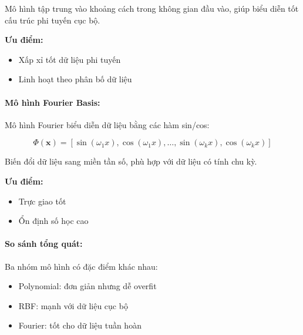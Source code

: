 Mô hình tập trung vào khoảng cách trong không gian đầu vào, giúp biểu diễn tốt cấu trúc phi tuyến cục bộ.

\textbf{Ưu điểm:}
\begin{itemize}
    \item Xấp xỉ tốt dữ liệu phi tuyến
    \item Linh hoạt theo phân bố dữ liệu
\end{itemize}

\paragraph{Mô hình Fourier Basis:}
Mô hình Fourier biểu diễn dữ liệu bằng các hàm sin/cos:

\begin{equation}
\Phi(\boldsymbol{x}) =
[\sin(\omega_1 x), \cos(\omega_1 x), \dots, \sin(\omega_k x), \cos(\omega_k x)]
\end{equation}

Biến đổi dữ liệu sang miền tần số, phù hợp với dữ liệu có tính chu kỳ.

\textbf{Ưu điểm:}
\begin{itemize}
    \item Trực giao tốt
    \item Ổn định số học cao
\end{itemize}

\paragraph{So sánh tổng quát:}
Ba nhóm mô hình có đặc điểm khác nhau:

\begin{itemize}
    \item Polynomial: đơn giản nhưng dễ overfit
    \item RBF: mạnh với dữ liệu cục bộ
    \item Fourier: tốt cho dữ liệu tuần hoàn
\end{itemize}

